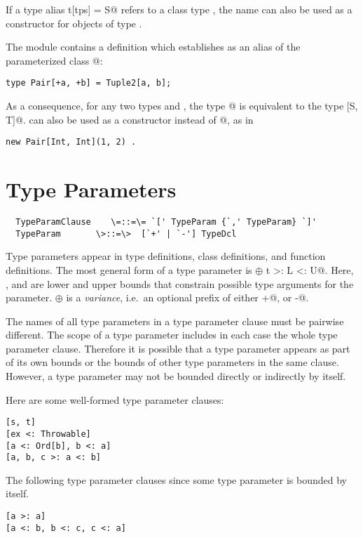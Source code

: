 \documentclass[11pt]{report}
\begin{document}
If a type alias \verb@type t[tps] = S@ refers to a class type
\verb@S@, the name \verb@t@ can also be used as a constructor for
objects of type \verb@S@.

\example The \verb@Predef@ module contains a definition which establishes \verb@Pair@ 
as an alias of the parameterized class @:
\begin{verbatim}
type Pair[+a, +b] = Tuple2[a, b];
\end{verbatim}
As a consequence, for any two types \verb@S@ and \verb@T@, the type
\verb@Pair[S, T]@ is equivalent to the type [S, T]@.
\verb@Pair@ can also be used as a constructor instead of @, as in
\begin{verbatim}
new Pair[Int, Int](1, 2) .
\end{verbatim}

\section{Type Parameters}

\syntax\begin{verbatim}
  TypeParamClause    \=::=\= `[' TypeParam {`,' TypeParam} `]'
  TypeParam       \>::=\>  [`+' | `-'] TypeDcl
\end{verbatim}

\newcommand{\plusminus}{\oplus}

Type parameters appear in type definitions, class definitions, and
function definitions.  The most general form of a type parameter is
\verb@$\plusminus$ t >: L <: U@.  Here, \verb@L@, and \verb@U@ are lower
and upper bounds that constrain possible type arguments for the
parameter. $\plusminus$ is a {\em variance}, i.e.\ an optional prefix 
of either \verb@+@, or \verb@-@.

The names of all type parameters in a type parameter clause must be
pairwise different.  The scope of a type parameter includes in each
case the whole type parameter clause. Therefore it is possible that a
type parameter appears as part of its own bounds or the bounds of
other type parameters in the same clause.  However, a type parameter
may not be bounded directly or indirectly by itself.

\example Here are some well-formed type parameter clauses:
\begin{verbatim}
[s, t]
[ex <: Throwable]
[a <: Ord[b], b <: a]
[a, b, c >: a <: b]
\end{verbatim}
The following type parameter clauses since some type parameter is bounded by itself.
\begin{verbatim}
[a >: a]                 
[a <: b, b <: c, c <: a]
\end{verbatim}
\end{document}
